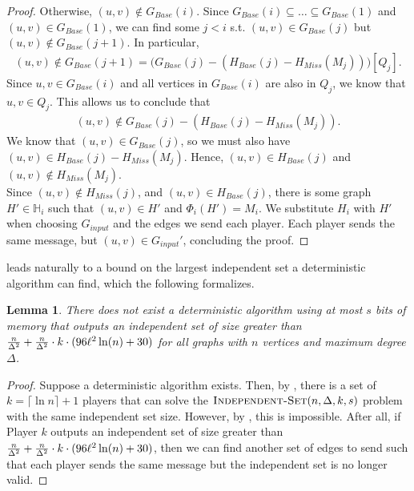 \documentclass[11pt]{article}
\newtheorem{lemma}{Lemma}[section]
\theoremstyle{definition}
\begin{document}
\begin{proof}
Otherwise, $(u, v)\not\in G_{Base}(i)$. Since $G_{Base}(i)\subseteq\dots\subseteq G_{Base}(1)$ and $(u, v)\in G_{Base}(1)$, we can find some $j<i$ s.t. $(u, v)\in G_{Base}(j)$ but $(u, v)\not\in G_{Base}(j+1)$. In particular,
\begin{align*}
(u,v)\not\in G_{Base}(j+1)=\big(G_{Base}(j)-(H_{Base}(j)-H_{Miss}(M_j))\big)[Q_j].
\end{align*}
Since $u, v\in G_{Base}(i)$ and all vertices in $G_{Base}(i)$ are also in $Q_j$, we know that $u,v\in Q_j$. This allows us to conclude that 
\begin{align*}
    (u, v)\not\in G_{Base}(j)-(H_{Base}(j)-H_{Miss}(M_j)).
\end{align*}
We know that $(u, v)\in G_{Base}(j)$, so we must also have $(u, v)\in H_{Base}(j)-H_{Miss}(M_j)$. Hence, $(u, v)\in H_{Base}(j)$ and $(u, v)\not\in H_{Miss}(M_j)$. \\

Since $(u, v)\not\in H_{Miss}(j)$, and $(u, v)\in H_{Base}(j)$, there is some graph $H'\in \mathbb{H}_i$ such that $(u, v)\in H'$ and $\Phi_i(H')=M_i$. We substitute $H_i$ with $H'$ when choosing $G_{input}$ and the edges we send each player. Each player sends the same message, but $(u, v)\in G_{input}'$, concluding the proof. 
\end{proof}

 leads naturally to a bound on the largest independent set a deterministic algorithm can find, which the following formalizes. 

\begin{lemma}\label{deterministic-lower-bound}
There does not exist a deterministic algorithm using at most $s$ bits of memory that outputs an independent set of size greater than $\frac{n}{\Delta^2}+\frac{n}{\Delta^2}\cdot k\cdot (96{\ell}^2\ln(n)+30)$ for all graphs with $n$ vertices and maximum degree $\Delta$.
\end{lemma}
\begin{proof}
    Suppose a deterministic algorithm exists. Then, by , there is a set of $k=\lceil \ln n\rceil +1$ players that can solve the $\textnormal{\textsc{Independent-Set}}(n, \Delta, k, s)$ problem with the same independent set size. However, by , this is impossible. After all, if Player $k$ outputs an independent set of size greater than $\frac{n}{\Delta^2}+\frac{n}{\Delta^2}\cdot k\cdot (96{\ell}^2\ln(n)+30)$, then we can find another set of edges to send such that each player sends the same message but the independent set is no longer valid. 
\end{proof}
\end{document}
